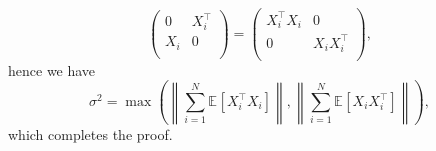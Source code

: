 \begin{answer}
\[\begin{pmatrix}
			0   & X_i ^{\top} \\
			X_i & 0           \\
		\end{pmatrix}
		= \begin{pmatrix}
			X_i ^{\top} X_i & 0               \\
			0               & X_i X_i ^{\top} \\
		\end{pmatrix},
	\]
	hence we have
	\[
		\sigma ^2
		= \max \left( \left\lVert \sum_{i=1}^{N} \mathbb{E}_{}[X_i ^{\top} X_i] \right\rVert , \left\lVert \sum_{i=1}^{N} \mathbb{E}_{}[X_i X_i ^{\top} ] \right\rVert \right),
	\]
	which completes the proof.
\end{answer}
